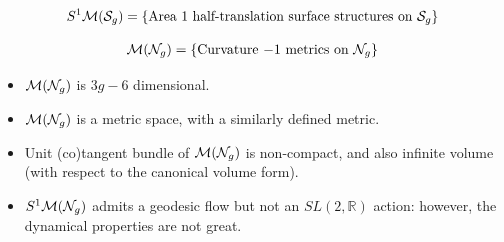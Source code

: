 \begin{frame}
  \begin{align*}
    S^1 \mathcal{M}(\mathcal{S}_g) = \left\{ \text{Area $1$ half-translation surface structures on $\mathcal{S}_g$} \right\}
  \end{align*}

\end{frame}

\begin{frame}
  \begin{align*}
    \mathcal{M}(\mathcal{N}_g) = \left\{ \text{Curvature $-1$ metrics on $\mathcal{N}_g$} \right\}
  \end{align*}
  \begin{itemize}
  \item<2-> $\mathcal{M}(\mathcal{N}_g)$ is $3g-6$ dimensional.
  \item<3-> $\mathcal{M}(\mathcal{N}_g)$ is a metric space, with a similarly defined metric.
  \item<4-> Unit (co)tangent bundle of $\mathcal{M}(\mathcal{N}_g)$ is non-compact, and also infinite volume (with respect to the canonical volume form).
  \item<5->  $S^1 \mathcal{M}(\mathcal{N}_g)$ admits a geodesic flow but not an $SL(2, \mathbb{R})$ action: however, the dynamical properties are not great.
  \end{itemize}
\end{frame}

